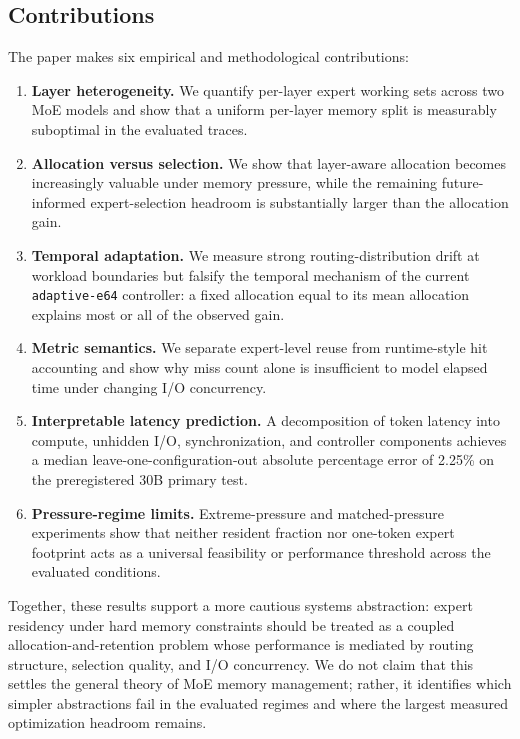 \subsection{Contributions}

The paper makes six empirical and methodological contributions:
\begin{enumerate}
    \item \textbf{Layer heterogeneity.} We quantify per-layer expert working sets across two MoE models and show that a uniform per-layer memory split is measurably suboptimal in the evaluated traces.
    \item \textbf{Allocation versus selection.} We show that layer-aware allocation becomes increasingly valuable under memory pressure, while the remaining future-informed expert-selection headroom is substantially larger than the allocation gain.
    \item \textbf{Temporal adaptation.} We measure strong routing-distribution drift at workload boundaries but falsify the temporal mechanism of the current \texttt{adaptive-e64} controller: a fixed allocation equal to its mean allocation explains most or all of the observed gain.
    \item \textbf{Metric semantics.} We separate expert-level reuse from runtime-style hit accounting and show why miss count alone is insufficient to model elapsed time under changing I/O concurrency.
    \item \textbf{Interpretable latency prediction.} A decomposition of token latency into compute, unhidden I/O, synchronization, and controller components achieves a median leave-one-configuration-out absolute percentage error of 2.25\% on the preregistered 30B primary test.
    \item \textbf{Pressure-regime limits.} Extreme-pressure and matched-pressure experiments show that neither resident fraction nor one-token expert footprint acts as a universal feasibility or performance threshold across the evaluated conditions.
\end{enumerate}

Together, these results support a more cautious systems abstraction: expert residency under hard memory constraints should be treated as a coupled allocation-and-retention problem whose performance is mediated by routing structure, selection quality, and I/O concurrency. We do not claim that this settles the general theory of MoE memory management; rather, it identifies which simpler abstractions fail in the evaluated regimes and where the largest measured optimization headroom remains.
